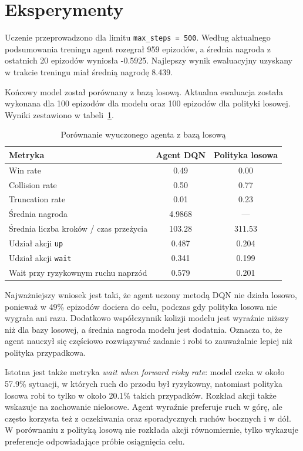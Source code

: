 \documentclass[12pt,a4paper]{article}
\begin{document}
\section{Eksperymenty}
Uczenie przeprowadzono dla limitu \texttt{max\_steps = 500}. Według aktualnego podsumowania treningu agent rozegrał 959 epizodów, a średnia nagroda z ostatnich 20 epizodów wyniosła -0.5925. Najlepszy wynik ewaluacyjny uzyskany w trakcie treningu miał średnią nagrodę 8.439.

Końcowy model został porównany z bazą losową. Aktualna ewaluacja została wykonana dla 100 epizodów dla modelu oraz 100 epizodów dla polityki losowej. Wyniki zestawiono w tabeli~\ref{tab:wyniki}.

\begin{table}[H]
\centering
\caption{Porównanie wyuczonego agenta z bazą losową}
\label{tab:wyniki}
\begin{tabular}{lcc}
\toprule
Metryka & Agent DQN & Polityka losowa \\
\midrule
Win rate & 0.49 & 0.00 \\
Collision rate & 0.50 & 0.77 \\
Truncation rate & 0.01 & 0.23 \\
Średnia nagroda & 4.9868 & --- \\
Średnia liczba kroków / czas przeżycia & 103.28 & 311.53 \\
Udział akcji \texttt{up} & 0.487 & 0.204 \\
Udział akcji \texttt{wait} & 0.341 & 0.199 \\
Wait przy ryzykownym ruchu naprzód & 0.579 & 0.201 \\
\bottomrule
\end{tabular}
\end{table}

Najważniejszy wniosek jest taki, że agent uczony metodą DQN nie działa losowo, ponieważ w 49\% epizodów dociera do celu, podczas gdy polityka losowa nie wygrała ani razu. Dodatkowo współczynnik kolizji modelu jest wyraźnie niższy niż dla bazy losowej, a średnia nagroda modelu jest dodatnia. Oznacza to, że agent nauczył się częściowo rozwiązywać zadanie i robi to zauważalnie lepiej niż polityka przypadkowa.

Istotna jest także metryka \textit{wait when forward risky rate}: model czeka w około 57.9\% sytuacji, w których ruch do przodu był ryzykowny, natomiast polityka losowa robi to tylko w około 20.1\% takich przypadków. Rozkład akcji także wskazuje na zachowanie nielosowe. Agent wyraźnie preferuje ruch w górę, ale często korzysta też z oczekiwania oraz sporadycznych ruchów bocznych i w dół. W porównaniu z polityką losową nie rozkłada akcji równomiernie, tylko wykazuje preferencje odpowiadające próbie osiągnięcia celu.
\end{document}
